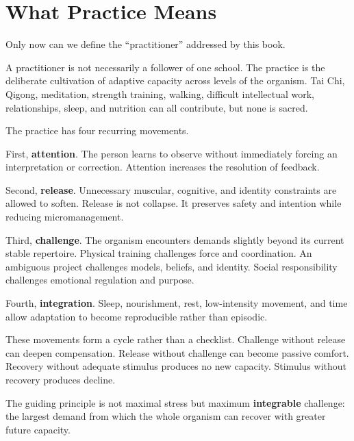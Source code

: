 \chapter{What Practice Means}\label{chapter-15-what-practice-means}

Only now can we define the ``practitioner'' addressed by this book.

A practitioner is not necessarily a follower of one school. The practice is the deliberate cultivation of adaptive capacity across levels of the organism. Tai Chi, Qigong, meditation, strength training, walking, difficult intellectual work, relationships, sleep, and nutrition can all contribute, but none is sacred.

The practice has four recurring movements.

First, \textbf{attention}. The person learns to observe without immediately forcing an interpretation or correction. Attention increases the resolution of feedback.

Second, \textbf{release}. Unnecessary muscular, cognitive, and identity constraints are allowed to soften. Release is not collapse. It preserves safety and intention while reducing micromanagement.

Third, \textbf{challenge}. The organism encounters demands slightly beyond its current stable repertoire. Physical training challenges force and coordination. An ambiguous project challenges models, beliefs, and identity. Social responsibility challenges emotional regulation and purpose.

Fourth, \textbf{integration}. Sleep, nourishment, rest, low-intensity movement, and time allow adaptation to become reproducible rather than episodic.

These movements form a cycle rather than a checklist. Challenge without release can deepen compensation. Release without challenge can become passive comfort. Recovery without adequate stimulus produces no new capacity. Stimulus without recovery produces decline.

The guiding principle is not maximal stress but maximum \textbf{integrable} challenge: the largest demand from which the whole organism can recover with greater future capacity.

